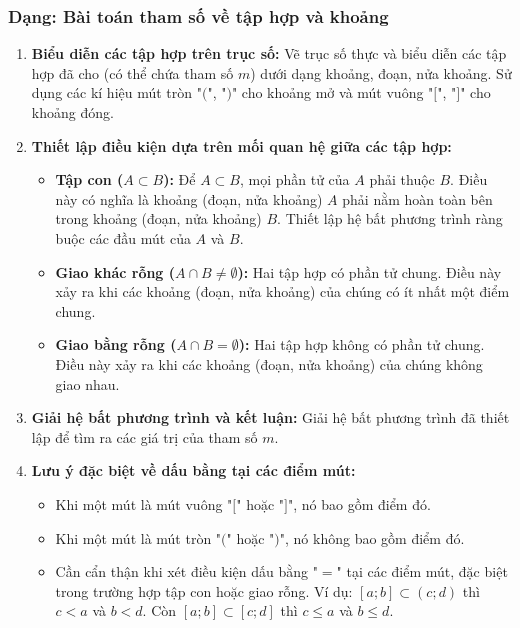 \subsubsection{Dạng: Bài toán tham số về tập hợp và khoảng}
\begin{phuongphap}
\begin{enumerate}
\item \textbf{Biểu diễn các tập hợp trên trục số:} Vẽ trục số thực và biểu diễn các tập hợp đã cho (có thể chứa tham số $m$) dưới dạng khoảng, đoạn, nửa khoảng. Sử dụng các kí hiệu mút tròn "$($", "$)$" cho khoảng mở và mút vuông "$[$", "$]$" cho khoảng đóng.
\item \textbf{Thiết lập điều kiện dựa trên mối quan hệ giữa các tập hợp:}
\begin{itemize}
    \item \textbf{Tập con ($A \subset B$):} Để $A \subset B$, mọi phần tử của $A$ phải thuộc $B$. Điều này có nghĩa là khoảng (đoạn, nửa khoảng) $A$ phải nằm hoàn toàn bên trong khoảng (đoạn, nửa khoảng) $B$. Thiết lập hệ bất phương trình ràng buộc các đầu mút của $A$ và $B$.
    \item \textbf{Giao khác rỗng ($A \cap B \ne \emptyset$):} Hai tập hợp có phần tử chung. Điều này xảy ra khi các khoảng (đoạn, nửa khoảng) của chúng có ít nhất một điểm chung.
    \item \textbf{Giao bằng rỗng ($A \cap B = \emptyset$):} Hai tập hợp không có phần tử chung. Điều này xảy ra khi các khoảng (đoạn, nửa khoảng) của chúng không giao nhau.
\end{itemize}
\item \textbf{Giải hệ bất phương trình và kết luận:} Giải hệ bất phương trình đã thiết lập để tìm ra các giá trị của tham số $m$.
\item \textbf{Lưu ý đặc biệt về dấu bằng tại các điểm mút:}
\begin{itemize}
    \item Khi một mút là mút vuông "$[$" hoặc "$]$", nó bao gồm điểm đó.
    \item Khi một mút là mút tròn "$($" hoặc "$)$", nó không bao gồm điểm đó.
    \item Cần cẩn thận khi xét điều kiện dấu bằng "$=$" tại các điểm mút, đặc biệt trong trường hợp tập con hoặc giao rỗng. Ví dụ: $[a; b] \subset (c; d)$ thì $c < a$ và $b < d$. Còn $[a; b] \subset [c; d]$ thì $c \le a$ và $b \le d$.
\end{itemize}
\end{enumerate}
\end{phuongphap}

